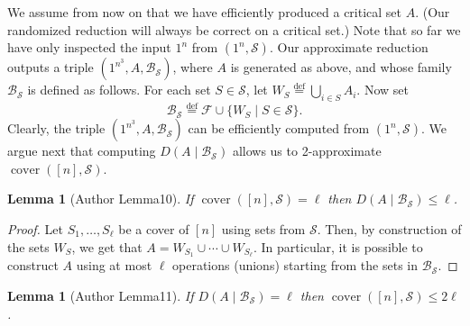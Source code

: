 \documentclass[10pt,a4paper]{article}
\newtheorem{ntlemma}[nttheorem]{Lemma}
\begin{document}
We assume from now on that we have efficiently produced a critical set $A$. (Our randomized reduction will always be correct on a critical set.) Note that so far we have only inspected the input $1^n$ from $(1^n,\mathcal S)$. Our approximate reduction outputs a triple $(1^{n^3},A,\mathcal B_{\mathcal S})$, where $A$ is generated as above, and whose family $\mathcal B_{\mathcal S}$ is defined as follows. For each set $S\in\mathcal S$, let $W_S\stackrel{\mathrm{def}}=\bigcup_{i\in S}A_i$. Now set
\[\mathcal B_{\mathcal S}\stackrel{\mathrm{def}}=\mathcal F\cup\{W_S\mid S\in\mathcal S\}.\]
Clearly, the triple $(1^{n^3},A,\mathcal B_{\mathcal S})$ can be efficiently computed from $(1^n,\mathcal S)$. We argue next that computing $D(A\mid\mathcal B_{\mathcal S})$ allows us to 2-approximate $\operatorname{cover}([n],\mathcal S)$.
\begin{ntlemma}[Author Lemma10]
If $\operatorname{cover}([n],\mathcal S)=\ell$ then $D(A\mid\mathcal B_{\mathcal S})\leq\ell$.
\end{ntlemma}
\begin{proof}
Let $S_1,\ldots,S_\ell$ be a cover of $[n]$ using sets from $\mathcal S$. Then, by construction of the sets $W_S$, we get that $A=W_{S_1}\cup\cdots\cup W_{S_\ell}$. In particular, it is possible to construct $A$ using at most $\ell$ operations (unions) starting from the sets in $\mathcal B_{\mathcal S}$.
\end{proof}
\begin{ntlemma}[Author Lemma11]
If $D(A\mid\mathcal B_{\mathcal S})=\ell$ then $\operatorname{cover}([n],\mathcal S)\leq2\ell$.
\end{ntlemma}
\end{document}
